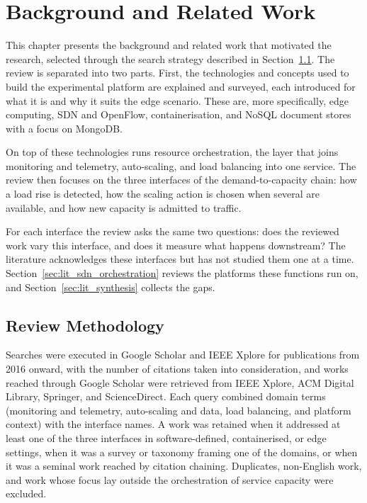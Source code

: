 ﻿\documentclass[12pt,reqno,twoside]{amsbook}
\begin{document}
\raggedbottom
\chapter{Background and Related Work}\label{ch:literature_review} %
This chapter presents the background and related work that motivated
the research, selected through the search strategy described in
Section~\ref{sec:review_method}. The review is separated into two parts.
First, the technologies and concepts used to build the experimental
platform are explained and surveyed, each introduced for what it is
and why it suits the edge scenario. These are, more specifically,
edge computing, SDN and OpenFlow, containerisation, and NoSQL
document stores with a focus on MongoDB.

On top of these technologies runs resource orchestration, the layer that
joins monitoring and telemetry, auto-scaling, and load balancing into one
service. The review then focuses on the three interfaces of the
demand-to-capacity chain: how a load rise is detected, how the scaling action
is chosen when several are available, and how new capacity is admitted to
traffic.

For each interface the review asks the same two questions: does the
reviewed work vary this interface, and does it measure what happens
downstream? The literature acknowledges these interfaces but has not studied
them one at a time. Section~\ref{sec:lit_sdn_orchestration} reviews the
platforms these functions run on, and Section~\ref{sec:lit_synthesis} collects
the gaps.

\section{Review Methodology}\label{sec:review_method} %
Searches were executed in Google Scholar and IEEE Xplore for publications from
2016 onward, with the number of citations taken into consideration, and works
reached through Google Scholar were retrieved from IEEE Xplore, ACM Digital
Library, Springer, and ScienceDirect. Each query combined domain terms
(monitoring and telemetry, auto-scaling and data, load balancing, and platform
context) with the interface names. A work was retained when it addressed at least one of the three
interfaces in software-defined, containerised, or edge settings, when it was a
survey or taxonomy framing one of the domains, or when it was a seminal work
reached by citation chaining. Duplicates, non-English work, and work whose focus
lay outside the orchestration of service capacity were excluded.
\end{document}
